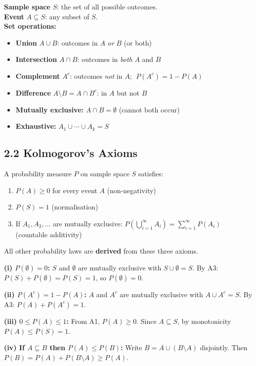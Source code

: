\documentclass[12pt]{article}
\begin{document}
\begin{defbox}
\textbf{Sample space} $S$: the set of all possible outcomes.\\
\textbf{Event} $A \subseteq S$: any subset of $S$.\\[6pt]
\textbf{Set operations:}
\begin{itemize}[noitemsep]
  \item \textbf{Union} $A\cup B$: outcomes in $A$ \textit{or} $B$ (or both)
  \item \textbf{Intersection} $A\cap B$: outcomes in \textit{both} $A$ and $B$
  \item \textbf{Complement} $A^c$: outcomes \textit{not} in $A$; $\;P(A^c)=1-P(A)$
  \item \textbf{Difference} $A\setminus B = A\cap B^c$: in $A$ but not $B$
  \item \textbf{Mutually exclusive:} $A\cap B=\emptyset$ (cannot both occur)
  \item \textbf{Exhaustive:} $A_1\cup\cdots\cup A_k = S$
\end{itemize}
\end{defbox}

\subsection{2.2 Kolmogorov's Axioms}

\begin{thmbox}
A probability measure $P$ on sample space $S$ satisfies:
\begin{enumerate}[noitemsep,label=\textbf{A\arabic*.}]
  \item $P(A)\geq 0$ for every event $A$ \hfill (non-negativity)
  \item $P(S)=1$ \hfill (normalisation)
  \item If $A_1,A_2,\ldots$ are mutually exclusive: $P\!\left(\bigcup_{i=1}^\infty A_i\right)=\sum_{i=1}^\infty P(A_i)$ \hfill (countable additivity)
\end{enumerate}
All other probability laws are \textbf{derived} from these three axioms.
\end{thmbox}

\begin{derivbox}
\textbf{(i) $P(\emptyset)=0$:} $S$ and $\emptyset$ are mutually exclusive with $S\cup\emptyset=S$. By A3: $P(S)+P(\emptyset)=P(S)=1$, so $P(\emptyset)=0$.\smallskip

\textbf{(ii) $P(A^c)=1-P(A)$:} $A$ and $A^c$ are mutually exclusive with $A\cup A^c=S$. By A3: $P(A)+P(A^c)=1$.\smallskip

\textbf{(iii) $0\leq P(A)\leq 1$:} From A1, $P(A)\geq 0$. Since $A\subseteq S$, by monotonicity $P(A)\leq P(S)=1$.\smallskip

\textbf{(iv) If $A\subseteq B$ then $P(A)\leq P(B)$:} Write $B=A\cup(B\setminus A)$ disjointly. Then $P(B)=P(A)+P(B\setminus A)\geq P(A)$.
\end{derivbox}
\end{document}
